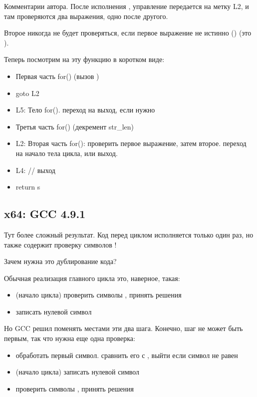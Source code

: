 

Комментарии автора.
После исполнения \strlen{}, управление передается на метку L2,
и там проверяются два выражения, одно после другого.

Второе никогда не будет проверяться, если первое выражение не истинно ()
(это ).

Теперь посмотрим на эту функцию в коротком виде:

\begin{itemize}
\item Первая часть for() (вызов \strlen{})
\item goto L2
\item L5: Тело for(). переход на выход, если нужно
\item Третья часть for() (декремент str\_len)
\item L2: Вторая часть for(): проверить первое выражение, затем второе. 
переход на начало тела цикла, или выход.

\item L4: // выход
\item return s
\end{itemize}

\subsection{x64: \Optimizing GCC 4.9.1}
\label{string_trim_GCC_x64_O3}



Тут более сложный результат.
Код перед циклом исполняется только один раз, но также содержит проверку символов \CRLF{}!

Зачем нужна это дублирование кода?

Обычная реализация главного цикла это, наверное, такая:

\begin{itemize}
\item (начало цикла) проверить символы \CRLF{}, принять решения

\item записать нулевой символ
\end{itemize}

Но GCC решил поменять местами эти два шага. 
Конечно, шаг  не может быть первым, так что нужна еще одна
проверка:


\begin{itemize}
\item обработать первый символ. сравнить его с \CRLF{}, выйти если символ не равен \CRLF{}

\item (начало цикла) записать нулевой символ

\item проверить символы \CRLF{}, принять решения

\end{itemize}


